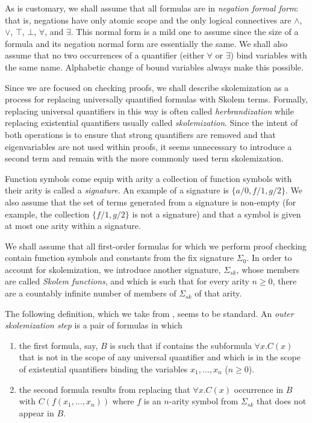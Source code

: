 \documentclass[a4paper,USenglish]{lipics-v2018}
\begin{document}
As is customary, we shall assume that all formulas are in
\emph{negation formal form}: that is, negations have only atomic scope
and the only logical connectives are $\land$, $\lor$, $\top$, $\bot$,
$\forall$, and $\exists$.
%
This normal form is a mild one to assume since the size of a formula
and its negation normal form are essentially the same.
%
We shall also assume that no two occurrences of a quantifier (either
$\forall$ or $\exists$) bind variables with the same name.
%
Alphabetic change of bound variables always make this possible.

Since we are focused on checking proofs, we shall describe
skolemization as a process for replacing universally quantified
formulas with Skolem terms.
%
Formally, replacing universal quantifiers in this way is often called
\emph{herbrandization} while replacing existential quantifiers usually
called  \emph{skolemization}.
%
Since the intent of both operations is to ensure that strong
quantifiers are removed and that eigenvariables are not used within
proofs, it seems unnecessary to introduce a second term and remain
with the more commonly used term skolemization.

Function symbols come equip with arity a collection of function
symbols with their arity is called a \emph{signature}.
%
An example of a signature is $\{a/0, f/1, g/2\}$.
%
We also assume that the set of terms generated from a signature is
non-empty (for example, the collection $\{f/1, g/2\}$ is not a
signature) and that a symbol is given at most one arity within a
signature.

\newcommand{\sksig}{\Sigma_{sk}}

We shall assume that all first-order formulas for which we perform
proof checking contain function symbols and constants from the fix
signature $\Sigma_0$.
%
In order to account for skolemization, we introduce
another signature, $\sksig$, whose members are called \emph{Skolem
  functions}, and which is such that for every arity $n\ge0$, there
are a countably infinite number of members of $\sksig$ of that arity.
%

The following definition, which we take from
\cite{nonnengart01handbook}, seems to be standard.
%
An \emph{outer skolemization step} is a pair of formulas in which
\begin{enumerate}

\item the first formula, say, $B$ is such that if contains the
  subformula $\forall x.C(x)$ that is not in the scope of any
  universal quantifier and which is in the scope of existential
  quantifiers binding the variables $x_1,\ldots,x_n$ ($n\ge0$).

\item the second formula results from replacing that $\forall x.C(x)$
  occurrence in $B$ with $C(f(x_1,\ldots,x_n))$ where $f$ is an
  $n$-arity symbol from $\sksig$ that does not appear in $B$.
\end{enumerate}
\end{document}
